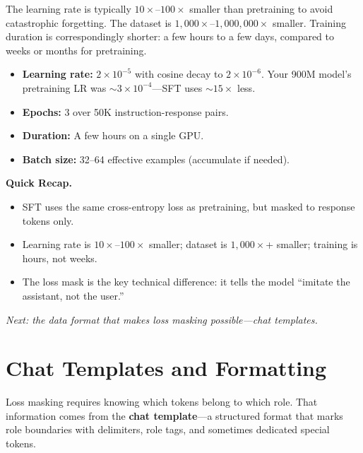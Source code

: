 The learning rate is typically $10\times$--$100\times$ smaller than pretraining to avoid catastrophic forgetting. The dataset is $1{,}000\times$--$1{,}000{,}000\times$ smaller. Training duration is correspondingly shorter: a few hours to a few days, compared to weeks or months for pretraining.

\begin{tcolorbox}[colback=orange!5, colframe=orange!60, title=\textbf{For Project~3: SFT Hyperparameters}]
\begin{itemize}[nosep]
  \item \textbf{Learning rate:} $2 \times 10^{-5}$ with cosine decay to $2 \times 10^{-6}$. Your 900M model's pretraining LR was $\sim$$3 \times 10^{-4}$---SFT uses $\sim$$15\times$ less.
  \item \textbf{Epochs:} 3 over 50K instruction-response pairs.
  \item \textbf{Duration:} A few hours on a single GPU.
  \item \textbf{Batch size:} 32--64 effective examples (accumulate if needed).
\end{itemize}
\end{tcolorbox}

\begin{quickrecap}
\textbf{Quick Recap.}
\begin{itemize}[nosep,leftmargin=1.5em]
  \item SFT uses the same cross-entropy loss as pretraining, but masked to response tokens only.
  \item Learning rate is $10\times$--$100\times$ smaller; dataset is $1{,}000\times$+ smaller; training is hours, not weeks.
  \item The loss mask is the key technical difference: it tells the model ``imitate the assistant, not the user.''
\end{itemize}
\textit{Next: the data format that makes loss masking possible---chat templates.}
\end{quickrecap}


\section{Chat Templates and Formatting}
\label{sec:chat-templates}

Loss masking requires knowing which tokens belong to which role. That information comes from the \textbf{chat template}---a structured format that marks role boundaries with delimiters, role tags, and sometimes dedicated special tokens.

